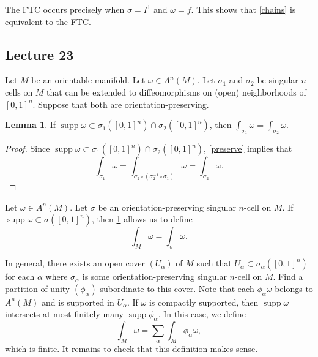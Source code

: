 \documentclass[10pt,letterpaper,cm]{nupset}
\theoremstyle{definition}
\theoremstyle{theorem}
\newtheorem{lemma}[definition]{Lemma}
\theoremstyle{remark}
\newcommand{\1}{\mathbf{1}}
\newcommand{\0}{\vec 0}
\DeclareMathOperator{\supp}{supp}
\begin{document}
\smallskip

The FTC occurs precisely when $\sigma = I^1$ and $\omega = f$. This shows that \cref{chains} is equivalent to the FTC.



\subsection{Lecture 23}

Let $M$ be an orientable manifold. Let $\omega \in A^n(M)$. Let $\sigma_1$ and $\sigma_2$ be singular $n$-cells on $M$ that can be extended to diffeomorphisms on (open) neighborhoods of $\left[0,1\right]^n$. Suppose that both are orientation-preserving. 

\begin{lemma}\label{orient}
If $\supp \omega \subset  \sigma_1(\left[0,1\right]^n) \cap \sigma_2(\left[0,1\right]^n)$, then $\int_{\sigma_1} \omega = \int_{\sigma_2} \omega$.
\end{lemma}
\begin{proof}
Since $\supp \omega \subset  \sigma_1(\left[0,1\right]^n) \cap \sigma_2(\left[0,1\right]^n)$, \cref{preserve} implies that 
\[
\int_{\sigma_1} \omega = \int_{\sigma_2 \circ (\sigma_2^{-1} \circ \sigma_1)} \omega  = \int_{\sigma_2} \omega     .
\]
\end{proof}

\medskip

 Let $\omega \in A^n(M)$. Let $\sigma$ be an orientation-preserving singular $n$-cell on $M$. If $\supp \omega \subset \sigma(\left[0,1\right]^n)$, then \cref{orient} allows us to define $$\int_M \omega = \int_{\sigma} \omega.$$

\smallskip


 In general, there exists an open cover $(U_{\alpha})$ of $M$ such that $U_{\alpha} \subset \sigma_{\alpha}(\left[0,1\right]^n)$ for each $\alpha$ where $\sigma_{\alpha}$ is some orientation-preserving singular $n$-cell on $M$. Find a partition of unity $(\phi_{\alpha})$ subordinate to this cover. Note that each $\phi_{\alpha} \omega$ belongs to  $A^n(M)$ and is supported in $U_{\alpha}$. If $\omega$ is compactly supported, then $\supp \omega$ intersects at most finitely many $\supp \phi_{\alpha}$. In this case, we define $$\int_M \omega = \sum_{\alpha}  \int_M \phi_{\alpha} \omega,$$ which is finite. 
It remains to check that this definition makes sense.
\end{document}
